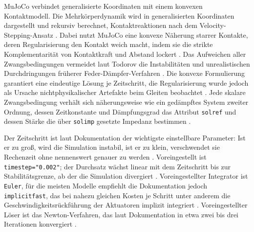 MuJoCo verbindet generalisierte Koordinaten mit einem konvexen Kontaktmodell.
Die Mehrkörperdynamik wird in generalisierten Koordinaten dargestellt und rekursiv berechnet, Kontaktreaktionen nach dem Velocity-Stepping-Ansatz \cite{Todorov2012}.
Dabei nutzt MuJoCo eine konvexe Näherung starrer Kontakte, deren Regularisierung den Kontakt weich macht, indem sie die strikte Komplementarität von Kontaktkraft und Abstand lockert \cite{Acosta2022}.
Das Aufweichen aller Zwangsbedingungen vermeidet laut Todorov die Instabilitäten und unrealistischen Durchdringungen früherer Feder-Dämpfer-Verfahren \cite{Todorov2014}.
Die konvexe Formulierung garantiert eine eindeutige Lösung je Zeitschritt, die Regularisierung wurde jedoch als Ursache nichtphysikalischer Artefakte beim Gleiten beobachtet \cite{Acosta2022}.
Jede skalare Zwangsbedingung verhält sich näherungsweise wie ein gedämpftes System zweiter Ordnung, dessen Zeitkonstante und Dämpfungsgrad das Attribut \texttt{solref} und dessen Stärke die über \texttt{solimp} gesetzte Impedanz bestimmen \cite{MujocoDoku2026}.

Der Zeitschritt ist laut Dokumentation der wichtigste einstellbare Parameter: Ist er zu groß, wird die Simulation instabil, ist er zu klein, verschwendet sie Rechenzeit ohne nennenswert genauer zu werden \cite{MujocoDoku2026}.
Voreingestellt ist \texttt{timestep="0.002"}; der Durchsatz wächst linear mit dem Zeitschritt bis zur Stabilitätsgrenze, ab der die Simulation divergiert \cite{MujocoDoku2026b}.
Voreingestellter Integrator ist \texttt{Euler}, für die meisten Modelle empfiehlt die Dokumentation jedoch \texttt{implicitfast}, das bei nahezu gleichen Kosten je Schritt unter anderem die Geschwindigkeitsrückführung der Aktuatoren implizit integriert \cite{MujocoDoku2026b}.
Voreingestellter Löser ist das Newton-Verfahren, das laut Dokumentation in etwa zwei bis drei Iterationen konvergiert \cite{MujocoDoku2026b}.

